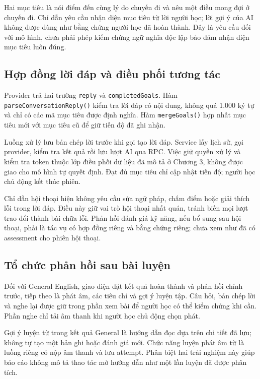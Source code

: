 \documentclass[12pt,a4paper,oneside]{report}
\begin{document}
Hai mục tiêu là nói điểm đến cùng lý do chuyến đi và nêu một điều mong đợi ở chuyến đi. Chỉ dẫn yêu cầu nhận diện mục tiêu từ lời người học; lời gợi ý của AI không được dùng như bằng chứng người học đã hoàn thành. Đây là yêu cầu đối với mô hình, chưa phải phép kiểm chứng ngữ nghĩa độc lập bảo đảm nhận diện mục tiêu luôn đúng.

\subsection{Hợp đồng lời đáp và điều phối tương tác}

Provider trả hai trường \texttt{reply} và \texttt{completedGoals}. Hàm \texttt{parseConversationReply()} kiểm tra lời đáp có nội dung, không quá 1.000 ký tự và chỉ có các mã mục tiêu được định nghĩa. Hàm \texttt{mergeGoals()} hợp nhất mục tiêu mới với mục tiêu cũ để giữ tiến độ đã ghi nhận.

Luồng xử lý lưu bản chép lời trước khi gọi tạo lời đáp. Service lấy lịch sử, gọi provider, kiểm tra kết quả rồi lưu lượt AI qua RPC. Việc giữ quyền xử lý và kiểm tra token thuộc lớp điều phối dữ liệu đã mô tả ở Chương 3, không được giao cho mô hình tự quyết định. Đạt đủ mục tiêu chỉ cập nhật tiến độ; người học chủ động kết thúc phiên.

Chỉ dẫn hội thoại hiện không yêu cầu sửa ngữ pháp, chấm điểm hoặc giải thích lỗi trong lời đáp. Điều này giữ vai trò hội thoại nhất quán, tránh biến mọi lượt trao đổi thành bài chữa lỗi. Phản hồi đánh giá kỹ năng, nếu bổ sung sau hội thoại, phải là tác vụ có hợp đồng riêng và bằng chứng riêng; chưa xem như đã có assessment cho phiên hội thoại.

\subsection{Tổ chức phản hồi sau bài luyện}

Đối với General English, giao diện đặt kết quả hoàn thành và phản hồi chính trước, tiếp theo là phát âm, các tiêu chí và gợi ý luyện tập. Câu hỏi, bản chép lời và nghe lại được giữ trong phần xem bài để người học có thể kiểm chứng khi cần. Phần nghe chỉ tải âm thanh khi người học chủ động chọn phát.

Gợi ý luyện từ trong kết quả General là hướng dẫn đọc dựa trên chi tiết đã lưu; không tự tạo một bản ghi hoặc đánh giá mới. Chức năng luyện phát âm từ là luồng riêng có nộp âm thanh và lưu attempt. Phân biệt hai trải nghiệm này giúp báo cáo không mô tả thao tác mở hướng dẫn như một lần luyện đã được phân tích.
\end{document}
